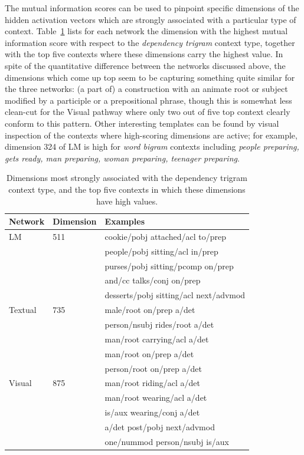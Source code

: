 The mutual information scores can be used to pinpoint specific
dimensions of the hidden activation vectors which are strongly
associated with a particular type of
context. Table~\ref{tab:mi-examples} lists for each network the
dimension with the highest mutual information score with respect to
the {\it dependency trigram} context type, together with the top
five contexts where these dimensions carry the highest value. In spite
of the quantitative difference between the networks discussed above,
the dimensions which come up top seem to be capturing something quite
similar for the three networks: (a part of) a construction with an
animate root or subject modified by a participle or a prepositional
phrase, though this is somewhat less clean-cut for the {\sc Visual}
pathway where only two out of five top context clearly conform to this
pattern.  Other interesting templates can be found by visual
inspection of the contexts where high-scoring dimensions are active;
for example, dimension 324 of {\sc LM} is high for {\it word bigram}
contexts including
{\it people preparing, gets ready, man preparing, woman preparing,
  teenager preparing}.

\begin{table}
  \centering
  \caption{Dimensions most strongly associated with the dependency trigram context type, and the top five contexts in which these dimensions have high values.}
\label{tab:mi-examples}
\begin{tabular}{lll}
  Network            & Dimension & Examples         \\\hline
  {\sc LM}           & 511       & cookie/pobj attached/acl to/prep \\
                     &           & people/pobj sitting/acl in/prep \\
                     &           & purses/pobj sitting/pcomp on/prep\\
                     &           & and/cc talks/conj on/prep \\
                     &           & desserts/pobj sitting/acl next/advmod \\\hline
  {\sc Textual}      & 735       & male/root on/prep a/det        \\
                     &           & person/nsubj rides/root a/det   \\
                     &           & man/root carrying/acl a/det \\
                     &           & man/root on/prep a/det         \\
                     &           & person/root on/prep a/det       \\\hline
  {\sc Visual}       &  875      & man/root riding/acl a/det \\
                     &           & man/root wearing/acl a/det \\
                     &           & is/aux wearing/conj a/det \\
                     &           & a/det post/pobj next/advmod \\
                     &           & one/nummod person/nsubj is/aux \\
\end{tabular}
\end{table}
